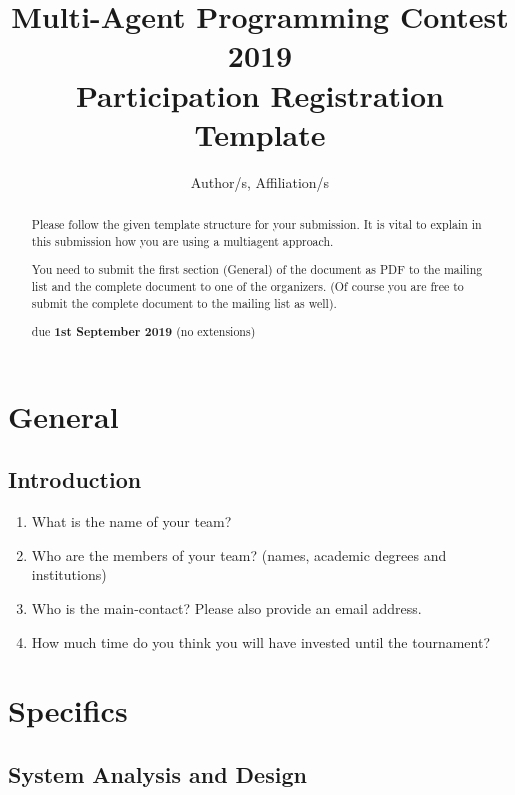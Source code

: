 \documentclass{article}
\begin{document}
\title{Multi-Agent Programming Contest 2019\\Participation Registration Template}
\author{Author/s, Affiliation/s}
\maketitle

\begin{abstract}
  Please follow the given template structure for your submission. It is vital to explain in this submission how you are using a multiagent approach.

  You need to submit the first section (General) of the document as PDF to the mailing list and the complete document to one of the organizers. (Of course you are free to submit the complete document to the mailing list as well).

  \begin{center}
    due \textbf{1st September 2019} (no extensions)
  \end{center}
\end{abstract}


\section*{General}

\subsection*{Introduction}

\begin{enumerate}
  \item What is the name of your team?
  \item Who are the members of your team? (names, academic degrees and institutions)
  \item Who is the main-contact? Please also provide an email address.
  \item How much time do you think you will have invested until the tournament?
\end{enumerate}

\section*{Specifics}

\subsection*{System Analysis and Design}
\end{document}
